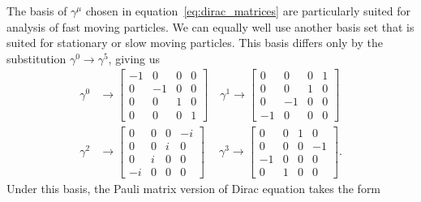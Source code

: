 \documentclass[titlepage,letterpaper,onecolumn,11pt,final]{report}
\newcommand{\gama}{\gamma^{0}}
\newcommand{\gamb}{\gamma^{1}}
\newcommand{\gamc}{\gamma^{2}}
\newcommand{\gamd}{\gamma^{3}}
\newcommand{\gamf}{\gamma^{5}}
\numberwithin{equation}{section}
\numberwithin{figure}{section}
\begin{document}
The basis of $\gamma^{\mu}$ chosen in equation~\ref{eq:dirac_matrices} are particularly suited for analysis of fast moving particles. We can equally well use another basis set that is suited for stationary or slow moving particles. This basis differs only by the substitution $\gama \rightarrow \gamf$, giving us
\begin{equation}
	\label{eq:dirac_matrices2}
	\begin{split}
	\gama & \rightarrow
	\begin{bmatrix}
		 -1 & 0 & 0 & 0 \\
		 0 & -1 & 0 & 0 \\
		 0 & 0 & 1 & 0 \\
		 0 & 0 & 0 & 1
	\end{bmatrix} \quad
	\gamb \rightarrow
	\begin{bmatrix}
		0 & 0 & 0 & 1 \\
		0 & 0 & 1 & 0 \\
		0 &-1 & 0 & 0 \\
		-1& 0 & 0 & 0
	\end{bmatrix} \\
	\gamc & \rightarrow
	\begin{bmatrix}
		0 & 0 & 0 &-i \\
		0 & 0 & i & 0 \\
		0 & i & 0 & 0 \\
		-i& 0 & 0 & 0
	\end{bmatrix} \quad \
	\gamd \rightarrow
	\begin{bmatrix}
		0 & 0 & 1 & 0 \\
		0 & 0 & 0 & -1 \\
		-1 & 0 & 0 & 0 \\
		0 & 1 & 0 & 0
	\end{bmatrix}.
	\end{split}
\end{equation}
%
Under this basis, the Pauli matrix version of Dirac equation takes the form
\end{document}
